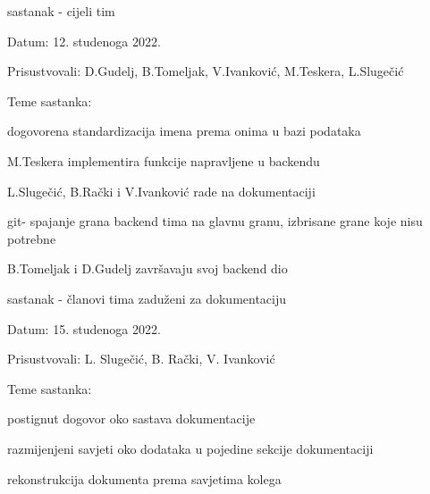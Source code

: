 \begin{packed_enum}
			
			\item  sastanak - cijeli tim
			\item[] \begin{packed_item}
				\item Datum: 12. studenoga 2022.
				\item Prisustvovali: D.Gudelj, B.Tomeljak, V.Ivanković, M.Teskera, L.Slugečić
				\item Teme sastanka:
				\begin{packed_item}
					\item dogovorena standardizacija imena prema onima u bazi podataka
					\item M.Teskera implementira funkcije napravljene u backendu
					\item L.Slugečić, B.Rački i V.Ivanković rade na dokumentaciji
					\item git- spajanje grana backend tima na glavnu granu, izbrisane grane koje nisu potrebne
					\item B.Tomeljak i D.Gudelj završavaju svoj backend dio
				\end{packed_item}
			\end{packed_item}
			\item  sastanak - 
            članovi tima zaduženi za dokumentaciju
			\item[] \begin{packed_item}
				\item Datum: 15. studenoga 2022.
				\item Prisustvovali: 
                L. Slugečić, B. Rački, V. Ivanković
				\item Teme sastanka:
				\begin{packed_item}
					\item 
                    postignut dogovor oko sastava dokumentacije
					\item 
                    razmijenjeni savjeti oko dodataka u pojedine sekcije dokumentaciji

					\item rekonstrukcija dokumenta prema savjetima kolega
				
				\end{packed_item}
			\end{packed_item}
			

\end{packed_enum}
